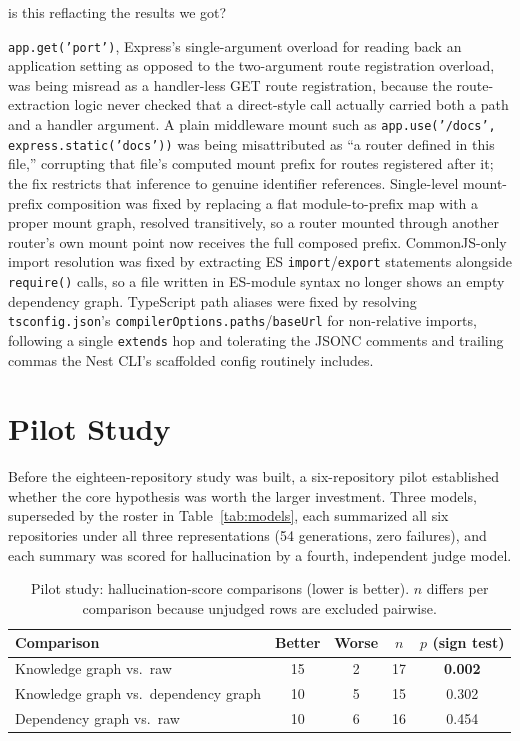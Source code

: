 is this reflacting the results we got?\documentclass[conference]{IEEEtran}
\begin{document}
\texttt{app.get('port')}, Express's single-argument overload for reading back an application
setting as opposed to the two-argument route registration overload, was being misread as a
handler-less GET route registration, because the route-extraction logic never checked that a
direct-style call actually carried both a path and a handler argument. A plain middleware mount
such as \texttt{app.use('/docs', express.static('docs'))} was being misattributed as ``a router
defined in this file,'' corrupting that file's computed mount prefix for routes registered after
it; the fix restricts that inference to genuine identifier references. Single-level mount-prefix
composition was fixed by replacing a flat module-to-prefix map with a proper mount graph,
resolved transitively, so a router mounted through another router's own mount point now receives
the full composed prefix. CommonJS-only import resolution was fixed by extracting ES
\texttt{import}/\texttt{export} statements alongside \texttt{require()} calls, so a file written
in ES-module syntax no longer shows an empty dependency graph. TypeScript path aliases were
fixed by resolving \texttt{tsconfig.json}'s \texttt{compilerOptions.paths}/\texttt{baseUrl} for
non-relative imports, following a single \texttt{extends} hop and tolerating the JSONC comments
and trailing commas the Nest CLI's scaffolded config routinely includes.

\section{Pilot Study}
\label{sec:pilot}

Before the eighteen-repository study was built, a six-repository pilot established whether the
core hypothesis was worth the larger investment. Three models, superseded by the roster in
Table~\ref{tab:models}, each summarized all six repositories under all three representations
(54 generations, zero failures), and each summary was scored for hallucination by a fourth,
independent judge model.

\begin{table}[htbp]
\caption{Pilot study: hallucination-score comparisons (lower is better). $n$ differs per
comparison because unjudged rows are excluded pairwise.}
\label{tab:pilot}
\centering
\begin{tabular}{@{}lcccc@{}}
\toprule
Comparison & Better & Worse & $n$ & $p$ (sign test) \\
\midrule
Knowledge graph vs.\ raw & 15 & 2 & 17 & \textbf{0.002} \\
Knowledge graph vs.\ dependency graph & 10 & 5 & 15 & 0.302 \\
Dependency graph vs.\ raw & 10 & 6 & 16 & 0.454 \\
\bottomrule
\end{tabular}
\end{table}
\end{document}
